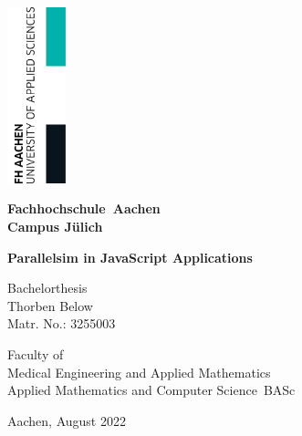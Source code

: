 \begin{titlepage}

	\thispagestyle{empty}

	\begin{flushright}
		\includegraphics[width=1.7cm]{./assets/FHAC.jpg}
	\end{flushright}
	\vspace{-2.5cm}

	\centering \bfseries \Large Fachhochschule~Aachen \\Campus Jülich
	\vspace{2.5cm}
	\normalsize

	\centering \begin{minipage}[t]{17cm}
		\centering \bfseries \large Parallelsim in JavaScript Applications
		\medskip
	\end{minipage}

	\vspace{2.5cm}

	\begin{minipage}[t]{9cm}
		\centering Bachelorthesis \\
		\centering Thorben Below \\ Matr. No.: 3255003
	\end{minipage}

	\vspace{3cm}
	\normalsize Faculty of\\
	Medical Engineering and Applied Mathematics \\
	Applied Mathematics and Computer Science~BASc
	\vspace{2.1cm}

	\vspace{2cm}
	\centering %
	\begin{minipage}[b]{7cm}
		\centering
		Aachen, August 2022\\
	\end{minipage}

	\restoregeometry

\end{titlepage}
